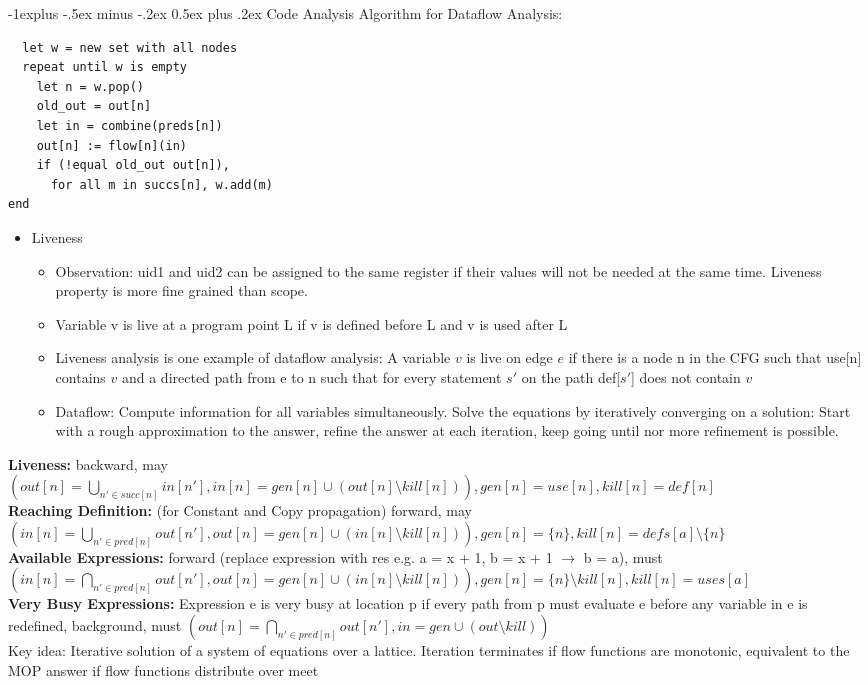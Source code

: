 \documentclass[10pt,landscape]{article}
\makeatletter
\renewcommand{\subsection}{\@startsection{subsection}{2}{0mm}%
                                {-1explus -.5ex minus -.2ex}%
                                {0.5ex plus .2ex}%
                                {\normalfont\normalsize\bfseries}}
\makeatother
\begin{document}
\begin{multicols}{3}
\subsection{Code Analysis}
Algorithm for Dataflow Analysis:
\begin{verbatim}
  let w = new set with all nodes
  repeat until w is empty
    let n = w.pop()
    old_out = out[n]
    let in = combine(preds[n])
    out[n] := flow[n](in)
    if (!equal old_out out[n]),
      for all m in succs[n], w.add(m)
end
\end{verbatim}
\begin{itemize}
	\item Liveness
	\begin{itemize}
		\item Observation: uid1 and uid2 can be assigned to the same register if their values will not be needed at the same time. Liveness property is more fine grained than scope.
		\item Variable v is live at a program point L if v is defined before L and v is used after L
		\item Liveness analysis is one example of dataflow analysis: A variable $v$ is live on edge $e$ if there is a node n in the CFG such that use[n] contains $v$ and a directed path from e to n such that for every statement $s'$ on the path def[$s'$] does not contain $v$
		\item Dataflow: Compute information for all variables simultaneously. Solve the equations by iteratively converging on a solution: Start with a rough approximation to the answer, refine the answer at each iteration, keep going until nor more refinement is possible.
		\end{itemize}
		\end{itemize}
	  \textbf{Liveness:} backward, may $(out[n] = \bigcup_{n' \in succ[n]} in[n'], in[n] = gen[n] \cup (out[n] \setminus kill[n])), gen[n] = use[n], kill[n] = def[n]$\\
		\textbf{Reaching Definition:} (for Constant and Copy propagation) forward, may $(in[n] = \bigcup_{n' \in pred[n]} out[n'], out[n] = gen[n] \cup (in[n] \setminus kill[n])), gen[n] = \{n\}, kill[n] = defs[a] \setminus \{n\}$\\
		\textbf{Available Expressions:} forward (replace expression with res e.g. a = x + 1, b = x + 1 $\rightarrow$ b = a), must $(in[n] = \bigcap_{n' \in pred[n]} out[n'], out[n] = gen[n] \cup (in[n] \setminus kill[n])), gen[n] = \{n\} \setminus kill[n], kill[n] = uses[a]$\\
    \textbf{Very Busy Expressions:} Expression e is very busy at location p if every path from p
    must evaluate e before any variable in e is redefined, background, must $(out[n] = \bigcap_{n' \in pred[n]} out[n'], in = gen \cup (out \setminus kill))$\\
		Key idea: Iterative solution of a system of equations over a lattice. Iteration terminates if flow functions are monotonic, equivalent to the MOP answer if flow functions distribute over meet

\end{multicols}
\end{document}
